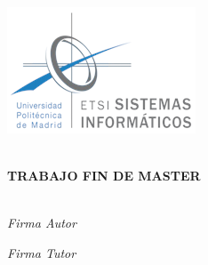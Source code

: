 \begin{titlepage}
\begin{center}

\begin{flushleft}
    \includegraphics[width=0.35\linewidth]{imgs/logo-etsisi.png}  \\[0.5 cm]
\end{flushleft}

\LARGE \MASTERNAME \\ [1 cm]

\LARGE \textbf{TRABAJO FIN DE MASTER}\\[1 cm]

\Huge \textsc{\TFM} \\[1 cm]


\hfill \break
\hfill \break

\begin{multicols}{2}
\begin{flushleft}
\Large \emph{Firma Autor}
\end{flushleft}

\begin{flushright}
\Large \emph{Firma Tutor}
\end{flushright}

\end{multicols}

\vfill

\end{center}
\end{titlepage}